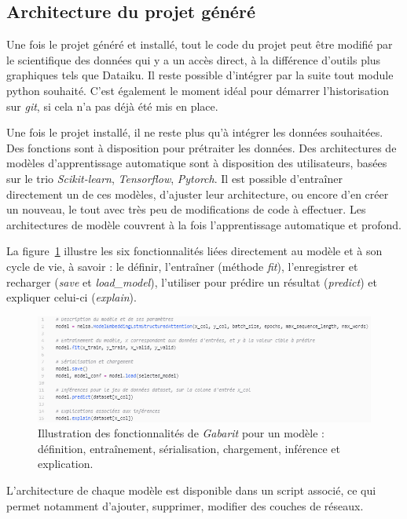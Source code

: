 \subsection{Architecture du projet généré}

Une fois le projet généré et installé, tout le code du projet peut être modifié par le scientifique des données qui y a un accès direct, à la différence d'outils plus graphiques tels que Dataiku. Il reste possible d'intégrer par la suite tout module python souhaité. C'est également le moment idéal pour démarrer l'historisation sur \textit{git}, si cela n'a pas déjà été mis en place.

Une fois le projet installé, il ne reste plus qu'à intégrer les données souhaitées. Des fonctions sont à disposition pour prétraiter les données. Des architectures de modèles d'apprentissage automatique sont à disposition des utilisateurs,  basées sur le trio \textit{Scikit-learn}, \textit{Tensorflow}, \textit{Pytorch}.
Il est possible d'entraîner directement un de ces modèles, d'ajuster leur architecture, ou encore d'en créer un nouveau, le tout avec très peu de modifications de code à effectuer. Les architectures de modèle couvrent à la fois l'apprentissage automatique et profond.

La figure~\ref{fig:api_gabarit} illustre les six fonctionnalités liées directement au modèle et à son cycle de vie, à savoir : le définir, l'entraîner (méthode \textit{fit}), l'enregistrer et recharger (\textit{save} et \textit{load\_model}), l'utiliser pour prédire un résultat (\textit{predict}) et expliquer celui-ci (\textit{explain}).
\begin{figure}[htpb!]
\centering
\includegraphics[width=\textwidth]{S5-Presentation_du_template_nlp/figures/usage_gabarit.png}
\caption{Illustration des fonctionnalités de \textit{Gabarit} pour un modèle : définition, entraînement, sérialisation, chargement, inférence et explication.}
\label{fig:api_gabarit}
\end{figure}

L'architecture de chaque modèle est disponible dans un script associé, ce qui permet notamment d'ajouter, supprimer, modifier des couches de réseaux.

